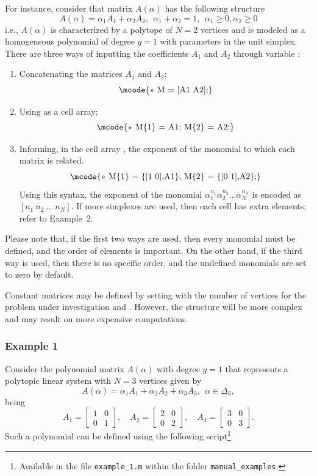 \documentclass[english,11pt]{article}
\theoremstyle{break} \theorembodyfont{\small\rm}
\begin{document}
For instance, consider that matrix $A(\alpha)$ has the following structure
\[
A(\alpha) = \alpha_1 A_1 + \alpha_2 A_2, ~~\alpha_1 + \alpha_2 = 1, ~~  \alpha_1 \geq 0, \alpha_2 \geq 0
\]
i.e., $A(\alpha)$ is characterized by a polytope of $N = 2$ vertices and is
modeled as a homogeneous polynomial of degree $g = 1$ with parameters in the unit simplex. There are three ways of inputting
the coefficients $A_1$ and $A_2$ through variable :
\begin{enumerate}
\item Concatenating the matrices $A_1$ and $A_2$;
\[
\mbox{\mcode{>> M = [A1 A2];}}
\]

\item Using  as a cell array;
\begin{equation}\label{eq_cell_array}
\mbox{\mcode{>> M\{1\} = A1; M\{2\} = A2;}}
\end{equation}

\item Informing, in the cell array , the exponent of the monomial to which each matrix
is related.
\begin{equation}\label{eq_cell_array_expon}
 \mbox{\mcode{>> M\{1\} = \{[1 0],A1\}; M\{2\} = \{[0 1],A2\};}}
\end{equation}
Using this syntax, the exponent of the monomial $\alpha_1^{n_1}\alpha_2^{n_2} \ldots \alpha_N^{n_N}$
is encoded as $[n_1 ~ n_2 ~ \ldots ~ n_N]$. If more simplexes are used, then each cell has
extra elements; refer to Example~2.
\end{enumerate}
Please note that, if the first two ways are used, then every monomial must be defined, 
and the order of elements is important. On the other hand, if the third way is used,
then there is no specific order, and the undefined monomials are set to zero by
default.

Constant matrices may be defined by setting  with
the number of vertices for the problem under investigation and . However,
the structure will be more complex and may result on more expensive
computations.


\subsubsection*{Example 1}
Consider the polynomial matrix $A(\alpha)$ with degree $g=1$ that represents a polytopic linear system 
with $N = 3$ vertices given by
\[
A(\alpha) = \alpha_1 A_1 + \alpha_2 A_2 + \alpha_3 A_3, ~ ~  \alpha \in \Delta_3,
\]
being
\[
 A_1 = \begin{bmatrix} 1 & 0 \\ 0 & 1 \end{bmatrix}, \quad
 A_2 = \begin{bmatrix} 2 & 0 \\ 0 & 2 \end{bmatrix}, \quad
 A_3 = \begin{bmatrix} 3 & 0 \\ 0 & 3 \end{bmatrix}.
\]
Such a polynomial can be defined using the following script\footnote{Available in the file \texttt{example\_1.m} within the folder \texttt{manual\_examples}.}
\end{document}

